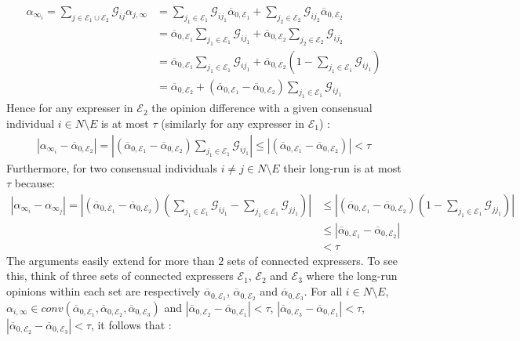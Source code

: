 \documentclass{article}
\begin{document}
\begin{enumerate}
\begin{align*}
\alpha_{\infty_i}  = \sum_{j \in \mathcal{E}_1 \cup \mathcal{E}_2} \mathcal{G}_{ij} \alpha_{j,\infty} & = \sum_{j_1 \in \mathcal{E}_1} \mathcal{G}_{ij_1} \overline{\alpha}_{0,{\mathcal{E}_1}} + \sum_{j_2 \in \mathcal{E}_2} \mathcal{G}_{ij_2} \overline{\alpha}_{0,{\mathcal{E}_2}} \\
& = \overline{\alpha}_{0,{\mathcal{E}_1}} \sum_{j_1 \in \mathcal{E}_1} \mathcal{G}_{ij_1}  + \overline{\alpha}_{0,{\mathcal{E}_2}} \sum_{j_2 \in \mathcal{E}_2} \mathcal{G}_{ij_2} \\
& = \overline{\alpha}_{0,{\mathcal{E}_1}} \sum_{j_1 \in \mathcal{E}_1} \mathcal{G}_{ij_1}  +\overline{\alpha}_{0,{\mathcal{E}_2}} (1 - \sum_{j_1 \in \mathcal{E}_1} \mathcal{G}_{ij_1}) \\
& = \overline{\alpha}_{0,{\mathcal{E}_2}} + (\overline{\alpha}_{0,{\mathcal{E}_1}}  - \overline{\alpha}_{0,{\mathcal{E}_2}} ) \sum_{j_1 \in \mathcal{E}_1} \mathcal{G}_{ij_1}  
\end{align*}
Hence for any expresser in $\mathcal{E}_2$ the opinion difference with a given consensual individual $i \in N \setminus E$ is at most $\tau$ (similarly for any expresser in $\mathcal{E}_1$) : 
\begin{align*}
|\alpha_{\infty_i} - \overline{\alpha}_{0,{\mathcal{E}_2}} | = |(\overline{\alpha}_{0,{\mathcal{E}_1}}  - \overline{\alpha}_{0,{\mathcal{E}_2}} ) \sum_{j_1 \in \mathcal{E}_1} \mathcal{G}_{ij_1} | \leq |(\overline{\alpha}_{0,{\mathcal{E}_1}}  - \overline{\alpha}_{0,{\mathcal{E}_2}} ) | < \tau
\end{align*}
Furthermore, for two consensual individuals $i \neq j \in N \setminus E$ their long-run is at most $\tau$ because:
\begin{align*}
|\alpha_{\infty_i} - {\alpha}_{\infty_j} | = |(\overline{\alpha}_{0,{\mathcal{E}_1}}  - \overline{\alpha}_{0,{\mathcal{E}_2}} ) ( \sum_{j_1 \in \mathcal{E}_1} \mathcal{G}_{ij_1} -  \sum_{j_1 \in \mathcal{E}_1} \mathcal{G}_{j j_1})  | & \leq |(\overline{\alpha}_{0,{\mathcal{E}_1}}  - \overline{\alpha}_{0,{\mathcal{E}_2}} ) (1 -  \sum_{j_1 \in \mathcal{E}_1} \mathcal{G}_{j j_1})   | \\ &  \leq | \overline{\alpha}_{0,{\mathcal{E}_1}}  - \overline{\alpha}_{0,{\mathcal{E}_2}}  | \\ & < \tau
\end{align*}
The arguments easily extend for more than $2$ sets of connected expressers. To see this, think of three sets of connected expressers ${\mathcal{E}_1}$, ${\mathcal{E}_2}$ and ${\mathcal{E}_3}$ where the long-run opinions within each set are respectively $\overline{\alpha}_{0,{\mathcal{E}_1}}$, $\overline{\alpha}_{0,{\mathcal{E}_2}}$ and $\overline{\alpha}_{0,{\mathcal{E}_3}}$. For all $i \in N \setminus E$,  $\alpha_{i,\infty} \in {conv}(\overline{\alpha}_{0,{\mathcal{E}_1}},\overline{\alpha}_{0,{\mathcal{E}_2}},\overline{\alpha}_{0,{\mathcal{E}_3}})$  and $|\overline{\alpha}_{0,{\mathcal{E}_2}} - \overline{\alpha}_{0,{\mathcal{E}_1}} |<\tau$,  $|\overline{\alpha}_{0,{\mathcal{E}_3}} - \overline{\alpha}_{0,{\mathcal{E}_1}} |<\tau$, $|\overline{\alpha}_{0,{\mathcal{E}_2}} - \overline{\alpha}_{0,{\mathcal{E}_3}} |<\tau$, it follows that : 

\end{enumerate}
\end{document}
